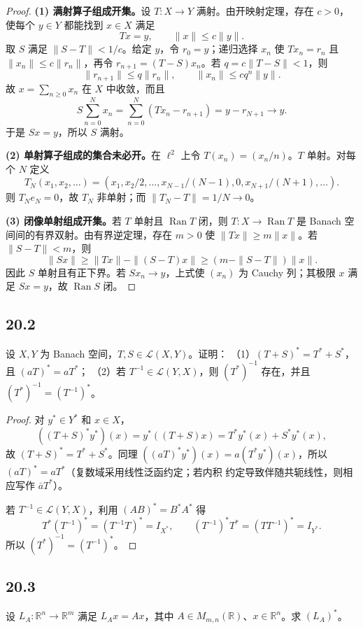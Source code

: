 \begin{proof}
\textbf{(1) 满射算子组成开集。}设 $T:X\to Y$ 满射。由开映射定理，存在 $c>0$，使每个
$y\in Y$ 都能找到 $x\in X$ 满足
\[
 Tx=y,\qquad \|x\|\leq c\|y\|.
\]
取 $S$ 满足 $\|S-T\|<1/c$。给定 $y$，令 $r_0=y$；递归选择 $x_n$ 使
$Tx_n=r_n$ 且 $\|x_n\|\leq c\|r_n\|$，再令 $r_{n+1}=(T-S)x_n$。若
$q=c\|T-S\|<1$，则
\[
 \|r_{n+1}\|\leq q\|r_n\|,\qquad \|x_n\|\leq c q^n\|y\|.
\]
故 $x=\sum_{n\geq0}x_n$ 在 $X$ 中收敛，而且
\[
 S\sum_{n=0}^N x_n=\sum_{n=0}^N(Tx_n-r_{n+1})=y-r_{N+1}\to y.
\]
于是 $Sx=y$，所以 $S$ 满射。

\textbf{(2) 单射算子组成的集合未必开。}在 $\ell^2$ 上令
$T(x_n)=(x_n/n)$。$T$ 单射。对每个 $N$ 定义
\[
 T_N(x_1,x_2,\ldots)=(x_1,x_2/2,\ldots,x_{N-1}/(N-1),0,x_{N+1}/(N+1),\ldots).
\]
则 $T_Ne_N=0$，故 $T_N$ 非单射；而 $\|T_N-T\|=1/N\to0$。

\textbf{(3) 闭像单射组成开集。}若 $T$ 单射且 $\operatorname{Ran}T$ 闭，则
$T:X\to\operatorname{Ran}T$ 是 Banach 空间间的有界双射。由有界逆定理，存在 $m>0$ 使
$\|Tx\|\geq m\|x\|$。若 $\|S-T\|<m$，则
\[
 \|Sx\|\geq\|Tx\|-\|(S-T)x\|\geq(m-\|S-T\|)\|x\|.
\]
因此 $S$ 单射且有正下界。若 $Sx_n\to y$，上式使 $(x_n)$ 为 Cauchy 列；其极限 $x$ 满足
$Sx=y$，故 $\operatorname{Ran}S$ 闭。
\end{proof}

\subsection*{20.2}
\begin{problem}
设 $X,Y$ 为 Banach 空间，$T,S\in\mathcal L(X,Y)$。证明：
（1）$(T+S)^*=T^*+S^*$，且 $(aT)^*=aT^*$；
（2）若 $T^{-1}\in\mathcal L(Y,X)$，则 $(T^*)^{-1}$ 存在，并且
$(T^*)^{-1}=(T^{-1})^*$。
\end{problem}

\begin{proof}
对 $y^*\in Y^*$ 和 $x\in X$，
\[
 ((T+S)^*y^*)(x)=y^*((T+S)x)=T^*y^*(x)+S^*y^*(x),
\]
故 $(T+S)^*=T^*+S^*$。同理
$((aT)^*y^*)(x)=a(T^*y^*)(x)$，所以 $(aT)^*=aT^*$（复数域采用线性泛函约定；若内积
约定导致伴随共轭线性，则相应写作 $\bar aT^*$）。

若 $T^{-1}\in\mathcal L(Y,X)$，利用 $(AB)^*=B^*A^*$ 得
\[
 T^*(T^{-1})^*=(T^{-1}T)^*=I_{X^*},\qquad
 (T^{-1})^*T^*=(TT^{-1})^*=I_{Y^*}.
\]
所以 $(T^*)^{-1}=(T^{-1})^*$。
\end{proof}

\subsection*{20.3}
\begin{problem}
设 $L_A:\mathbb R^n\to\mathbb R^m$ 满足 $L_Ax=Ax$，其中
$A\in M_{m,n}(\mathbb R)$、$x\in\mathbb R^n$。求 $(L_A)^*$。
\end{problem}

